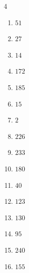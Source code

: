 \begin{multicols}{4}
\begin{enumerate}
  \item $51$


  \item $27$


  \item $14$


  \item $172$


  \item $185$


  \item $15$


  \item $2$


  \item $226$


  \item $233$


  \item $180$


  \item $40$


\columnbreak %

  \item $123$


  \item $130$


  \item $95$


  \item $240$


  \item $155$


\end{enumerate}
\end{multicols}
